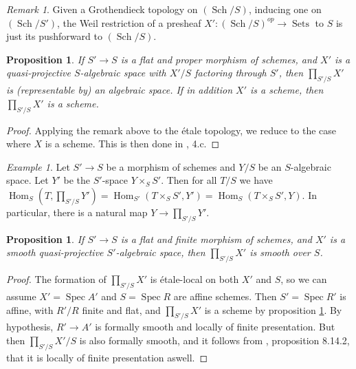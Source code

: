 \documentclass{article}
\DeclareMathOperator{\spec}{Spec}
\DeclareMathOperator{\sch}{Sch}
\DeclareMathOperator{\sets}{Sets}
\DeclareMathOperator{\Hom}{Hom}
\newtheorem{prop}[thm]{Proposition}
\theoremstyle{definition}
\theoremstyle{remark}
\newtheorem{rem}{Remark}[thm]
\newtheorem{ex}[thm]{Example}
\begin{document}
\begin{rem}
Given a Grothendieck topology on $(\sch/S)$, inducing one on $(\sch/S')$, the Weil restriction of a presheaf $X':(\sch/S)^{op}\longrightarrow\sets$ to $S$ is just its pushforward to $(\sch/S)$.
\end{rem}

\begin{prop}\label{prop representabilite de la restriction de Weil}
If $S'\longrightarrow S$ is a flat and proper morphism of schemes, and $X'$ is a quasi-projective $S$-algebraic space with $X'/S$ factoring through $S'$, then $\prod\limits_{S'/S}X'$ is (representable by) an algebraic space. If in addition $X'$ is a scheme, then $\prod\limits_{S'/S}X'$ is a scheme.
\end{prop}

\begin{proof}
Applying the remark above to the \'etale topology, we reduce to the case where $X$ is a scheme. This is then done in \cite{Bourbaki221}, 4.c.
\end{proof}

\begin{ex}\label{exemple Restriction de Weil d'un objet obtenu par changement de base}
Let $S'\longrightarrow S$ be a morphism of schemes and $Y/S$ be an $S$-algebraic space. Let $Y'$ be the $S'$-space $Y\times_S S'$. Then for all $T/S$ we have $\Hom_S(T,\prod\limits_{S'/S}Y')=\Hom_{S'}(T\times_S S',Y')=\Hom_S(T\times_S S',Y)$. In particular, there is a natural map $Y\longrightarrow\prod\limits_{S'/S}Y'$.
\end{ex}

\begin{prop}\label{prop lissite de la restriction de Weil}
If $S'\longrightarrow S$ is a flat and finite morphism of schemes, and $X'$ is a smooth quasi-projective $S'$-algebraic space, then $\prod\limits_{S'/S}X'$ is smooth over $S$.
\end{prop}

\begin{proof}
The formation of $\prod\limits_{S'/S}X'$ is \'etale-local on both $X'$ and $S$, so we can assume $X'=\spec A'$ and $S=\spec R$ are affine schemes. Then $S'=\spec R'$ is affine, with $R'/R$ finite and flat, and $\prod\limits_{S'/S}X'$ is a scheme by proposition \ref{prop representabilite de la restriction de Weil}. By hypothesis, $R'\longrightarrow A'$ is formally smooth and locally of finite presentation. But then $\prod\limits_{S'/S}X'/S$ is also formally smooth, and it follows from \cite{EGA4.3}, proposition 8.14.2, that it is locally of finite presentation aswell.
\end{proof}
\end{document}
